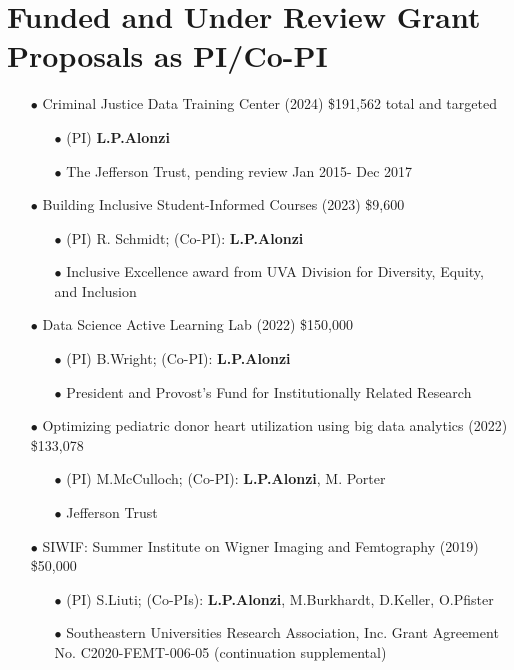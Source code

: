 \documentclass{article}[10pt]
\begin{document}
\section*{Funded and Under Review Grant Proposals as PI/Co-PI}
\begin{itemize}

\item[$\bullet$] Criminal Justice Data Training Center (2024) \$191,562 total and targeted
\begin{itemize}
\item[$\bullet$] (PI) {\bf L.P.Alonzi}
\item[$\bullet$] The Jefferson Trust, pending review Jan 2015- Dec 2017
\end{itemize}


\item[$\bullet$] Building Inclusive Student-Informed Courses (2023) \$9,600
\begin{itemize}
\item[$\bullet$] (PI) R. Schmidt; (Co-PI): {\bf L.P.Alonzi}
\item[$\bullet$] Inclusive Excellence award from UVA Division for Diversity, Equity, and Inclusion
\end{itemize}
\item[$\bullet$] Data Science Active Learning Lab (2022) \$150,000
\begin{itemize}
\item[$\bullet$] (PI) B.Wright; (Co-PI): {\bf L.P.Alonzi}
\item[$\bullet$] President and Provost’s Fund for Institutionally Related Research
\end{itemize}
\item[$\bullet$] Optimizing pediatric donor heart utilization using big data analytics (2022) \$133,078
\begin{itemize}
\item[$\bullet$] (PI) M.McCulloch; (Co-PI): {\bf L.P.Alonzi}, M. Porter
\item[$\bullet$] Jefferson Trust
\end{itemize}
\item[$\bullet$] SIWIF: Summer Institute on Wigner Imaging and Femtography (2019) \$50,000
\begin{itemize}
\item[$\bullet$] (PI) S.Liuti; (Co-PIs): {\bf L.P.Alonzi}, M.Burkhardt, D.Keller, O.Pfister
\item[$\bullet$] Southeastern Universities Research Association, Inc. Grant Agreement No. C2020-FEMT-006-05 (continuation supplemental)

\end{itemize}
\end{itemize}
\end{document}
